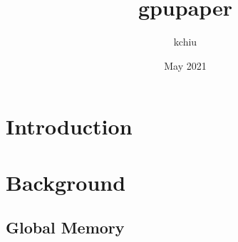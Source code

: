\documentclass[conference]{IEEEtran}
\title{gpupaper}
\author{kchiu }
\date{May 2021}
\begin{document}
\maketitle
\section{Introduction}
\section{Background}
\subsection{Global Memory}
%

\end{document}
